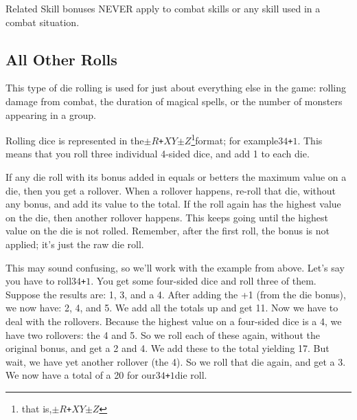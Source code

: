 \documentclass[twoside]{book}
\begin{document}
  
    {  
    Related Skill bonuses NEVER apply to combat skills or any skill used in a combat situation.
    }
  
    

\subsection{All Other Rolls}
    
    {  
    This type of die rolling is used for just about everything else in the game: rolling damage from combat, the duration of magical spells, or the number of monsters appearing in a group.
    }
  
    {  
    Rolling dice is represented in the\texttt{\ensuremath{\pm}}\ensuremath{R}\texttt{+}\ensuremath{X}\ensuremath{Y}\texttt{\ensuremath{\pm}}\ensuremath{Z}\footnote{that is,\texttt{\ensuremath{\pm}}\ensuremath{R}\texttt{+}\ensuremath{X}\ensuremath{Y}\texttt{\ensuremath{\pm}}\ensuremath{Z}}format; for example\ensuremath{3}\ensuremath{4}\texttt{+}\ensuremath{1}. This means that you roll three individual 4-sided dice, and add 1 to each die.
    }
  
    {  
    If any die roll with its bonus added in equals or betters the maximum value on a die, then you get a rollover. When a rollover happens, re-roll that die, without any bonus, and add its value to the total. If the roll again has the highest value on the die, then another rollover happens. This keeps going until the highest value on the die is not rolled. Remember, after the first roll, the bonus is not applied; it's just the raw die roll.
    }
  
    {  
    This may sound confusing, so we'll work with the example from above. Let's say you have to roll\ensuremath{3}\ensuremath{4}\texttt{+}\ensuremath{1}. You get some four-sided dice and roll three of them. Suppose the results are: 1, 3, and a 4. After adding the +1 (from the die bonus), we now have: 2, 4, and 5. We add all the totals up and get 11. Now we have to deal with the rollovers. Because the highest value on a four-sided dice is a 4, we have two rollovers: the 4 and 5. So we roll each of these again, without the original bonus, and get a 2 and 4. We add these to the total yielding 17. But wait, we have yet another rollover (the 4). So we roll that die again, and get a 3. We now have a total of a 20 for our\ensuremath{3}\ensuremath{4}\texttt{+}\ensuremath{1}die roll.
    }
  
\end{document}
